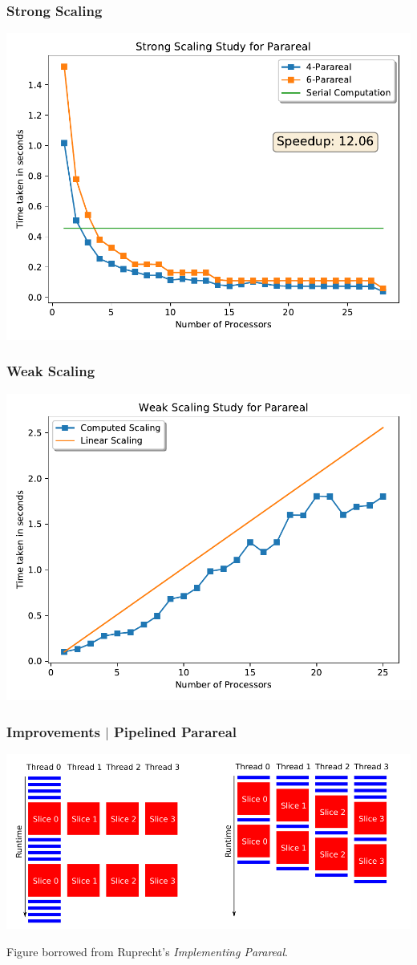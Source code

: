 \documentclass[pdf,12pt]{beamer}
\begin{document}
\begin{frame}
  \frametitle{Strong Scaling}
  \begin{center}
    \includegraphics[width=.8\textwidth]{./resources/strong_scaling}
  \end{center}
\end{frame}

\begin{frame}
  \frametitle{Weak Scaling}
  \begin{center}
    \includegraphics[width=.8\textwidth]{./resources/weak_scaling}
  \end{center}
\end{frame}

\begin{frame}
  \frametitle{Improvements $\mid$ Pipelined Parareal}
  \begin{center}
    \includegraphics[width=\textwidth]{./resources/pipelined_parareal}
  \end{center}
  Figure borrowed from Ruprecht's \textit{Implementing Parareal}.
\end{frame}
\end{document}

